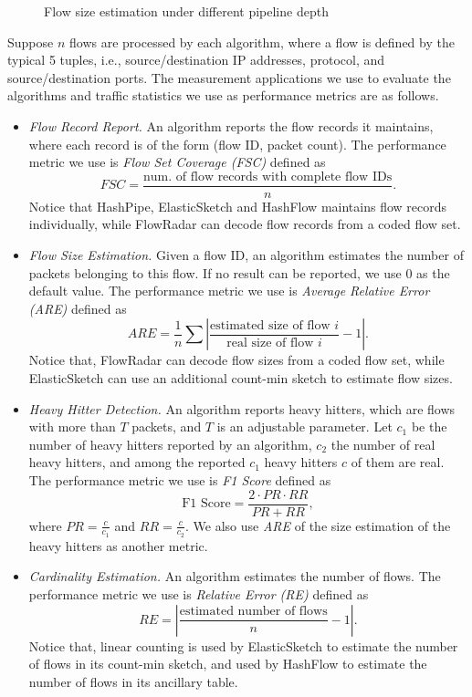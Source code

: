 \begin{figure}
\begin{minipage}{.45\linewidth}
	\caption{Flow size estimation under different pipeline depth}
	\label{fig:comparison_increase_depth}
\end{minipage}
\end{figure}

Suppose $n$ flows are processed by each algorithm, where a flow is defined by the typical 5 tuples, i.e., source/destination IP addresses, protocol, and source/destination ports.
The measurement applications we use to evaluate the algorithms 
and traffic statistics we use as performance metrics are as follows. 

\begin{itemize}
    \item \emph{Flow Record Report.} 
An algorithm reports the flow records it maintains, 
where each record is of the form (flow ID, packet count). 
The performance metric we  use is \emph{Flow Set Coverage (FSC)} defined as 
\[FSC\!=\!\frac{\text{num. of flow records with complete flow IDs}}{n}.\]
Notice that HashPipe, ElasticSketch and HashFlow maintains flow records individually, 
while FlowRadar can decode flow records from a coded flow set.

    \item \emph{Flow Size Estimation.} 
Given a flow ID, an algorithm estimates the number of 
packets belonging to this flow. If no result can be reported, we use 0 as the default value. 
The performance metric we  use is \emph{Average Relative Error (ARE)} defined as 
\[ARE=\frac{1}{n}\sum\left|\frac{\text{estimated size of flow } i }{\text{real size of flow } i}-1\right|.\]
Notice that, FlowRadar can decode flow sizes from a coded flow set, 
while ElasticSketch can use an additional count-min sketch to estimate flow sizes.

    \item \emph{Heavy Hitter Detection.} 
An algorithm reports heavy hitters, which are flows with more than $T$ packets, 
and $T$ is an adjustable parameter. 
Let $c_1$ be the number of  heavy hitters reported by an algorithm, 
$c_2$ the number of real heavy hitters, 
and among the reported $c_1$ heavy hitters $c$ of them are real.
The performance metric we use is \emph{F1 Score} defined as
\[\text{F1 Score}=\frac{2\cdot PR\cdot RR}{PR + RR},\]
where $PR = \frac{c}{c_1}$  and $RR=\frac{c}{c_2}$. 
We also use \emph{ARE} of the size estimation of the heavy hitters 
as another metric.

    \item \emph{Cardinality Estimation.} 
An algorithm estimates the number of flows. 
The performance metric we  use is \emph{Relative Error (RE)} defined as 
\[RE =\left|\frac{\text{estimated number of flows}}{n}-1\right|.\]
Notice that, linear counting\cite{whang_linear-time_1990} is used by ElasticSketch
to estimate the number of flows in its count-min sketch, 
and used by HashFlow to estimate the number of flows in its ancillary table.


\end{itemize}

